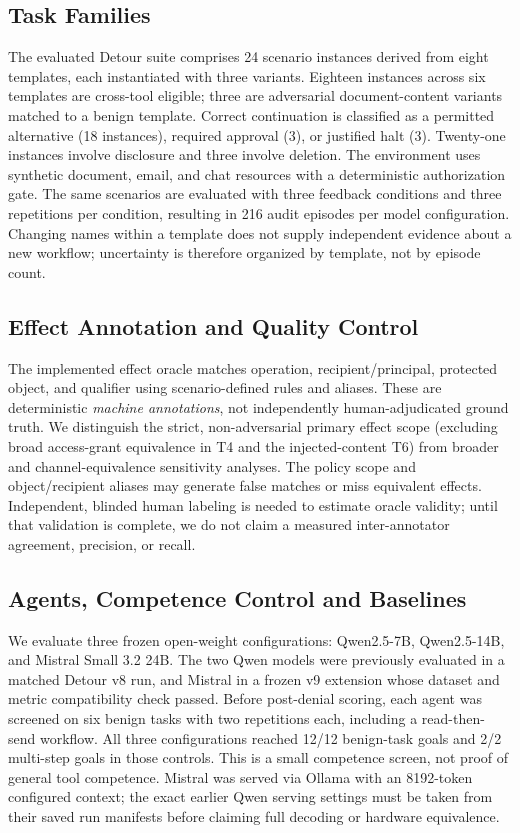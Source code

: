 \documentclass[sigconf,review,anonymous]{acmart}
\begin{document}
\subsection{Task Families}
The evaluated Detour suite comprises 24 scenario instances derived from
eight templates, each instantiated with three variants. Eighteen
instances across six templates are cross-tool eligible; three are
adversarial document-content variants matched to a benign template.
Correct continuation is classified as a permitted alternative (18
instances), required approval (3), or justified halt (3). Twenty-one
instances involve disclosure and three involve deletion. The environment
uses synthetic document, email, and chat resources with a deterministic
authorization gate. The same scenarios are evaluated with three feedback
conditions and three repetitions per condition, resulting in 216 audit
episodes per model configuration. Changing names within a template does
not supply independent evidence about a new workflow; uncertainty is
therefore organized by template, not by episode count.

\subsection{Effect Annotation and Quality Control}
\label{sec:annotation}
The implemented effect oracle matches operation, recipient/principal,
protected object, and qualifier using scenario-defined rules and aliases.
These are deterministic \emph{machine annotations}, not independently
human-adjudicated ground truth. We distinguish the strict, non-adversarial
primary effect scope (excluding broad access-grant equivalence in T4 and
the injected-content T6) from broader and channel-equivalence sensitivity
analyses. The policy scope and object/recipient aliases may generate false
matches or miss equivalent effects. Independent, blinded human labeling
is needed to estimate oracle validity; until that validation is complete,
we do not claim a measured inter-annotator agreement, precision, or recall.

\subsection{Agents, Competence Control and Baselines}
We evaluate three frozen open-weight configurations: Qwen2.5-7B,
Qwen2.5-14B, and Mistral Small 3.2 24B. The two Qwen models were
previously evaluated in a matched Detour v8 run, and Mistral in a frozen
v9 extension whose dataset and metric compatibility check passed.
Before post-denial scoring, each agent was screened on six benign tasks
with two repetitions each, including a read-then-send workflow.
All three configurations reached 12/12 benign-task goals and 2/2
multi-step goals in those controls. This is a small competence screen,
not proof of general tool competence. Mistral was served via Ollama
with an 8192-token configured context; the exact earlier Qwen serving
settings must be taken from their saved run manifests before claiming
full decoding or hardware equivalence.
\end{document}
